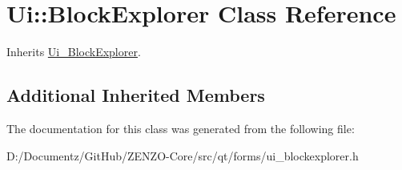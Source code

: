 \hypertarget{class_ui_1_1_block_explorer}{}\section{Ui\+::Block\+Explorer Class Reference}
\label{class_ui_1_1_block_explorer}


Inherits \mbox{\hyperlink{class_ui___block_explorer}{Ui\+\_\+\+Block\+Explorer}}.

\subsection*{Additional Inherited Members}


The documentation for this class was generated from the following file\+:\begin{DoxyCompactItemize}
\item 
D\+:/\+Documentz/\+Git\+Hub/\+Z\+E\+N\+Z\+O-\/\+Core/src/qt/forms/ui\+\_\+blockexplorer.\+h\end{DoxyCompactItemize}
